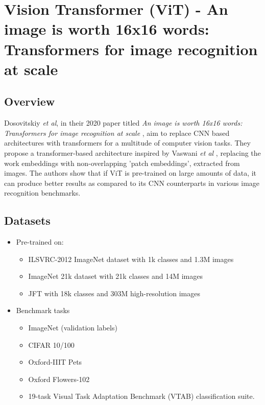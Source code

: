 \section{Vision Transformer (ViT) - An image is worth 16x16 words: Transformers for image recognition at scale} \label{appendix:vit-paper}

\subsection{Overview}

\par Dosovitskiy \textit{et al}, in their 2020 paper titled \textit{An image is worth 16x16 words: Transformers for image recognition at scale} \cite{vit}, aim to replace CNN based architectures with transformers for a multitude of computer vision tasks. They propose a transformer-based architecture inspired by Vaswani \textit{et al} \cite{tfm}, replacing the work embeddings with non-overlapping 'patch embeddings', extracted from images. The authors show that if ViT is pre-trained on large amounts of data, it can produce better results as compared to its CNN counterparts in various image recognition benchmarks.\par


\subsection{Datasets}
\begin{itemize}
\item Pre-trained on:
	\begin{itemize}
		\item ILSVRC-2012 ImageNet dataset with 1k classes and 1.3M images
		\item ImageNet 21k dataset with 21k classes and 14M images 
		\item JFT with 18k classes and 303M high-resolution images
	\end{itemize}
\item Benchmark tasks
	\begin{itemize}
		\item ImageNet (validation labels)
		\item CIFAR 10/100
		\item Oxford-IIIT Pets
		\item Oxford Flowers-102
		\item 19-task Visual Task Adaptation Benchmark (VTAB) classification suite.
	\end{itemize}
\end{itemize}


